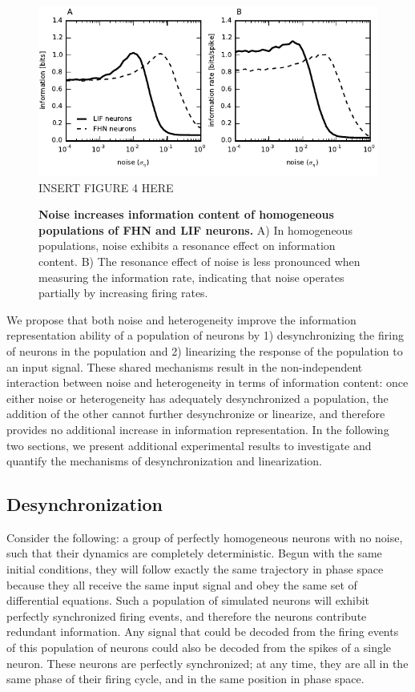 \documentclass[12pt]{article}
\begin{document}
\begin{figure}
  \ifx\hidefigures\undefined
    \centering
    \includegraphics[width=\textwidth]{figure4_infonoise.pdf}
  \else
    INSERT FIGURE 4 HERE
  \fi
  \caption{
    \textbf{Noise increases information content of homogeneous populations of FHN and LIF neurons.} A) In homogeneous populations, noise exhibits a resonance effect on information content. B) The resonance effect of noise is less pronounced when measuring the information rate, indicating that noise operates partially by increasing firing rates.
  }
  \label{fig:infonoise}
\end{figure}

We propose that both noise and heterogeneity improve the information representation ability of a population of neurons by 1) desynchronizing the firing of neurons in the population and 2) linearizing the response of the population to an input signal. These shared mechanisms result in the non-independent interaction between noise and heterogeneity in terms of information content: once either noise or heterogeneity has adequately desynchronized a population, the addition of the other cannot further desynchronize or linearize, and therefore provides no additional increase in information representation. In the following two sections, we present additional experimental results to investigate and quantify the mechanisms of desynchronization and linearization.


\subsection{Desynchronization}
\label{scn:desync}

Consider the following: a group of perfectly homogeneous neurons with no noise, such that their dynamics are completely deterministic. Begun with the same initial conditions, they will follow exactly the same trajectory in phase space because they all receive the same input signal and obey the same set of differential equations. Such a population of simulated neurons will exhibit perfectly synchronized firing events, and therefore the neurons contribute redundant information. Any signal that could be decoded from the firing events of this population of neurons could also be decoded from the spikes of a single neuron. These neurons are perfectly synchronized; at any time, they are all in the same phase of their firing cycle, and in the same position in phase space.
\end{document}
